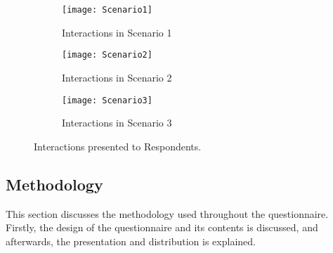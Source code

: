\begin{figure}[htb]
    \centering
    \begin{subfigure}[b]{0.3\textwidth}
        \centering
        \texttt{[image: Scenario1]}
        \caption{Interactions in Scenario 1}
        \label{fig: Scenario1}
    \end{subfigure}
    \begin{subfigure}[b]{0.3\textwidth}
        \centering
        \texttt{[image: Scenario2]}
        \caption{Interactions in Scenario 2} 
        \label{fig: Scenario2}
    \end{subfigure}
    \begin{subfigure}[b]{0.3\textwidth}
        \centering
        \texttt{[image: Scenario3]}
        \caption{Interactions in Scenario 3} 
        \label{fig: Scenario3}
    \end{subfigure}
    
    \caption{Interactions presented to Respondents.}
\end{figure}

\subsection{Methodology}
  
This section discusses the methodology used throughout the questionnaire. Firstly, the design of the questionnaire and its contents is discussed, and afterwards, the presentation and distribution is explained.

